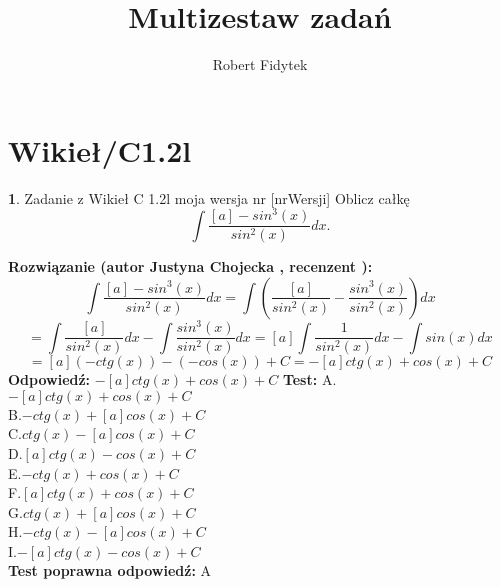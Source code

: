 \documentclass[12pt, a4paper]{article}
\title{Multizestaw zadań}
\author{Robert Fidytek}
\date{}
\theoremstyle{definition} %
\newtheorem{zad}{}
\newcommand{\kategoria}[1]{\section{#1}} %
\newcommand{\zadStart}[1]{\begin{zad}#1\newline} %
\newcommand{\zadStop}{\end{zad}}   %
\newcommand{\rozwStart}[2]{\noindent \textbf{Rozwiązanie (autor #1 , recenzent #2): }\newline} %
\newcommand{\rozwStop}{\newline}                                            %
\newcommand{\odpStart}{\noindent \textbf{Odpowiedź:}\newline}    %
\newcommand{\odpStop}{\newline}                                             %
\newcommand{\testStart}{\noindent \textbf{Test:}\newline} %
\newcommand{\testStop}{\newline} %
\newcommand{\kluczStart}{\noindent \textbf{Test poprawna odpowiedź:}\newline} %
\newcommand{\kluczStop}{\newline} %
\begin{document}
\maketitle
\kategoria{Wikieł/C1.2l}
\zadStart{Zadanie z Wikieł C 1.2l moja wersja nr [nrWersji]}
Oblicz całkę $$\int \frac{[a]-sin^{3}(x)}{sin^{2}(x)} dx.$$
\zadStop
\rozwStart{Justyna Chojecka}{}
$$\int \frac{[a]-sin^{3}(x)}{sin^{2}(x)} dx=\int \left(\frac{[a]}{sin^{2}(x)}-\frac{sin^{3}(x)}{sin^{2}(x)}\right)dx$$$$=\int \frac{[a]}{sin^{2}(x)}dx-\int\frac{sin^{3}(x)}{sin^{2}(x)}dx=[a]\int \frac{1}{sin^{2}(x)}dx-\int sin(x)dx$$$$=[a]\left(-ctg(x)\right)-\left(-cos(x)\right)+C=-[a]ctg(x)+cos(x)+C$$
\rozwStop
\odpStart
$-[a]ctg(x)+cos(x)+C$
\odpStop
\testStart
A.$-[a]ctg(x)+cos(x)+C$\\
B.$-ctg(x)+[a]cos(x)+C$\\
C.$ctg(x)-[a]cos(x)+C$\\
D.$[a]ctg(x)-cos(x)+C$\\
E.$-ctg(x)+cos(x)+C$\\
F.$[a]ctg(x)+cos(x)+C$\\
G.$ctg(x)+[a]cos(x)+C$\\
H.$-ctg(x)-[a]cos(x)+C$\\
I.$-[a]ctg(x)-cos(x)+C$\\
\testStop
\kluczStart
A
\kluczStop
\end{document}
